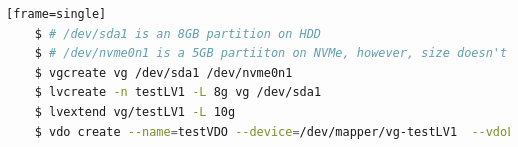 \documentclass[
  color, %
  table, %
  lof,   %
  lot,   %
]{fithesis3}
\begin{document}


\begin{lstlisting}[language=bash, label={ex:fast-journal}, caption={Creating a volume with last reagion on NVMe device}][frame=single]
    $ # /dev/sda1 is an 8GB partition on HDD
    $ # /dev/nvme0n1 is a 5GB partiiton on NVMe, however, size doesn't matter since we're only using first 2GB
    $ vgcreate vg /dev/sda1 /dev/nvme0n1
    $ lvcreate -n testLV1 -L 8g vg /dev/sda1
    $ lvextend vg/testLV1 -L 10g
    $ vdo create --name=testVDO --device=/dev/mapper/vg-testLV1  --vdoLogicalSize=80g
\end{lstlisting}
\end{document}
